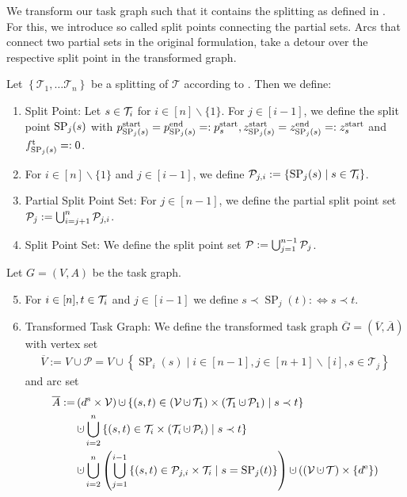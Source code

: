We transform our task graph such that it contains the splitting as defined in . For this, we introduce so called split points connecting the partial sets. Arcs that connect two partial sets in the original formulation, take a detour over the respective split point in the transformed graph.

\begin{definition}

Let $\left\{\mathcal{T}_1,\dots\mathcal{T}_n\right\}$ be a splitting of $\mathcal{T}$ according to . Then we define:
\begin{enumerate}
	\item{Split Point: Let $s\in\mathcal{T}_i$ for $i\in[n]\backslash\{1\}$. For $j\in[i-1]$, we define the split point $\operatorname{SP}_j(s)$ with $p^{\operatorname{start}}_{\operatorname{SP}_j(s)}=p^{\operatorname{end}}_{\operatorname{SP}_j(s)}=:p^{\operatorname{start}}_s, z^{\operatorname{start}}_{\operatorname{SP}_j(s)}=z^{\operatorname{end}}_{\operatorname{SP}_j(s)}=:z^{\operatorname{start}}_s$ and $f^{\operatorname{t}}_{\operatorname{SP}_j(s)}=:0$.}
	\item{For $i\in[n]\backslash\{1\}$ and $j\in[i-1]$, we define $\mathcal{P}_{j,i}:=\left\{\operatorname{SP}_j(s)\mid s\in\mathcal{T}_i\right\}$.}
	\item{Partial Split Point Set: For $j\in[n-1]$, we define the partial split point set $\mathcal{P}_j:=\bigcup_{i=j+1}^n \mathcal{P}_{j,i}$.}
	\item{Split Point Set: We define the split point set $\mathcal{P}:=\bigcup_{j=1}^{n-1}\mathcal{P}_j$.}
\end{enumerate}

Let $G=(V,A)$ be the task graph.
\begin{enumerate}
	\setcounter{enumi}{4}
	\item{For $i\in[n], t\in\mathcal{T}_i$ and $j\in[i-1]$ we define ${s\prec\operatorname{SP}_j(t):\Leftrightarrow s\prec t}$.}
	\item{Transformed Task Graph: We define the transformed task graph $\overline{G}=\left(\overline{V},\overline{A}\right)$ with vertex set
		\begin{align*}
			\overline{V} := V\cup \mathcal{P} = V\cup\left\{\operatorname{SP}_i(s)\mid i\in[n-1],j\in[n+1]\backslash[i],s\in\mathcal{T}_j\right\}
		\end{align*}
		and arc set
		\begin{align*}
			\overline{A} := & \left(\ds\times\mathcal{V}\right)\cupdot\left\{(s,t)\in\left(\mathcal{V}\cupdot\mathcal{T}_1\right)\times\left( \mathcal{T}_1\cupdot\mathcal{P}_1\right)\mid s\prec t\right\} \\
			& \cupdot\bigcup_{i=2}^n\left\{(s,t)\in\Ti\times\left(\Ti\cupdot \mathcal{P}_i\right)\mid s\prec t\right\} \\
			& \cupdot\bigcup_{i=2}^n\left(\bigcup_{j=1}^{i-1}\left\{(s,t)\in\mathcal{P}_{j,i}\times\Ti\mid s=\operatorname{SP}_j(t)\right\}\right)\cupdot \left(\left(\mathcal{V}\cupdot\mathcal{T}\right)\times\left\{\de\right\}\right)
		\end{align*}}
\end{enumerate}

\end{definition}

